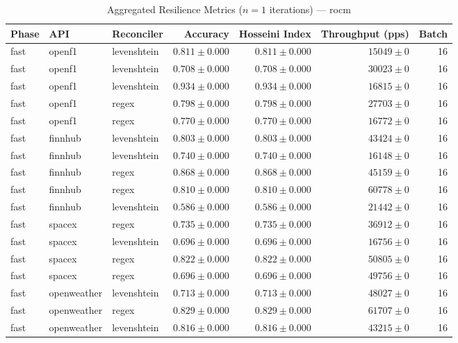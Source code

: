 
\begin{table}[htbp]
\caption{Aggregated Resilience Metrics ($n=1$ iterations) --- rocm}
\begin{tabular}{l l l r r r r}
\hline
Phase & API & Reconciler & Accuracy & Hosseini Index & Throughput (pps) & Batch \\
\hline
fast & openf1 & levenshtein & $0.811\pm0.000$ & $0.811\pm0.000$ & $15049\pm0$ & 16 \\
fast & openf1 & levenshtein & $0.708\pm0.000$ & $0.708\pm0.000$ & $30023\pm0$ & 16 \\
fast & openf1 & levenshtein & $0.934\pm0.000$ & $0.934\pm0.000$ & $16815\pm0$ & 16 \\
fast & openf1 & regex & $0.798\pm0.000$ & $0.798\pm0.000$ & $27703\pm0$ & 16 \\
fast & openf1 & regex & $0.770\pm0.000$ & $0.770\pm0.000$ & $16772\pm0$ & 16 \\
fast & finnhub & levenshtein & $0.803\pm0.000$ & $0.803\pm0.000$ & $43424\pm0$ & 16 \\
fast & finnhub & levenshtein & $0.740\pm0.000$ & $0.740\pm0.000$ & $16148\pm0$ & 16 \\
fast & finnhub & regex & $0.868\pm0.000$ & $0.868\pm0.000$ & $45159\pm0$ & 16 \\
fast & finnhub & regex & $0.810\pm0.000$ & $0.810\pm0.000$ & $60778\pm0$ & 16 \\
fast & finnhub & levenshtein & $0.586\pm0.000$ & $0.586\pm0.000$ & $21442\pm0$ & 16 \\
fast & spacex & regex & $0.735\pm0.000$ & $0.735\pm0.000$ & $36912\pm0$ & 16 \\
fast & spacex & levenshtein & $0.696\pm0.000$ & $0.696\pm0.000$ & $16756\pm0$ & 16 \\
fast & spacex & regex & $0.822\pm0.000$ & $0.822\pm0.000$ & $50805\pm0$ & 16 \\
fast & spacex & regex & $0.696\pm0.000$ & $0.696\pm0.000$ & $49756\pm0$ & 16 \\
fast & openweather & levenshtein & $0.713\pm0.000$ & $0.713\pm0.000$ & $48027\pm0$ & 16 \\
fast & openweather & regex & $0.829\pm0.000$ & $0.829\pm0.000$ & $61707\pm0$ & 16 \\
fast & openweather & levenshtein & $0.816\pm0.000$ & $0.816\pm0.000$ & $43215\pm0$ & 16 \\

\end{tabular}
\end{table}
